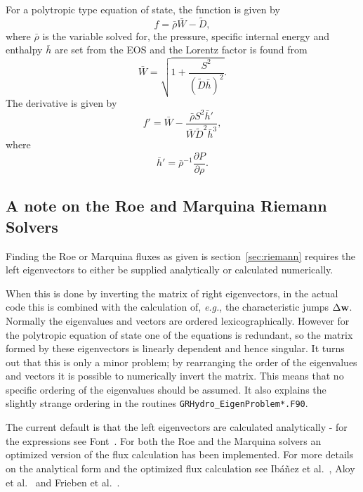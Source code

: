 \documentclass{article}
\begin{document}
For a polytropic type equation of state, the function is given by
\begin{equation}
  \label{eq:polyf}
  f = \bar{\rho}\bar{W} - \tilde{D},
\end{equation}
where $\bar{\rho}$ is the variable solved for, the pressure, specific
internal energy and enthalpy $\bar{h}$ are set from the EOS and the
Lorentz factor is found from
\begin{equation}
  \label{eq:polyw}
  \bar{W} = \sqrt{1 + \frac{S^2}{(\tilde{D}\bar{h})^2}}.
\end{equation}
The derivative is given by
\begin{equation}
  \label{eq:dpolyf}
  f' = \bar{W} - \frac{\bar{\rho}S^2 \bar{h}'}{\bar{W} \tilde{D}^2
  \bar{h}^3}, 
\end{equation}
where
\begin{equation}
  \label{eq:dpolyenth}
  \bar{h}' = \bar{\rho}^{-1}\frac{\partial P}{\partial \rho}.
\end{equation}

\subsection{A note on the Roe and Marquina Riemann Solvers}
\label{sec:rsnote}

Finding the Roe or Marquina fluxes as given is
section~\ref{sec:riemann} requires the left eigenvectors to either be
supplied analytically or calculated numerically. 

When this is done by inverting the matrix of right
eigenvectors, in the actual code this is combined with the calculation
of, {\it e.g.}, the characteristic jumps $\Delta {\bf w}$.
Normally the eigenvalues and vectors are ordered lexicographically.
However for the polytropic equation of state one of the equations is
redundant, so the matrix formed by these eigenvectors is linearly
dependent and hence singular. It turns out that this is only a minor
problem; by rearranging the order of the eigenvalues and vectors it is
possible to numerically invert the matrix. 
This means that no specific ordering of the eigenvalues should be
assumed. It also explains the slightly strange ordering in the
routines {\tt GRHydro\_EigenProblem*.F90}.

The current default is that the left eigenvectors are calculated
analytically - for the expressions see Font~\cite{livrevgrrfd}. For
both the Roe and the Marquina solvers an optimized version of the flux
calculation has been implemented. For more details on the analytical
form and the optimized flux calculation see Ib{\'a}{\~n}ez et
al.~\cite{Iban01}, Aloy et al.~\cite{Aloy99} and Frieben et
al.~\cite{Frie02}.
\end{document}
